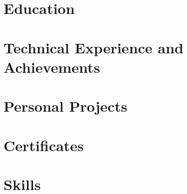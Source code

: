 \documentclass[letter,10pt]{article}
\begin{document}


\section{Education}


\section{Technical Experience and Achievements}


\section{Personal Projects}


\section{Certi\hspace{0pt}f\hspace{0pt}icates}


\section{Skills}

\end{document}
